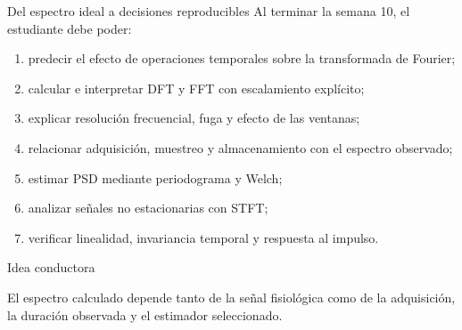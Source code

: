 \documentclass[
  10pt,
  ignorenonframetext,
  aspectratio=169,
  spanish,
]{beamer}
\providecommand{\tightlist}{%
  \setlength{\itemsep}{0pt}\setlength{\parskip}{0pt}}
\begin{document}
\begin{frame}{Del espectro ideal a decisiones reproducibles}
\label{d2-003}
Al terminar la semana 10, el estudiante debe poder:

\begin{enumerate}
\tightlist
\item
  predecir el efecto de operaciones temporales sobre la transformada de
  Fourier;
\item
  calcular e interpretar DFT y FFT con escalamiento explícito;
\item
  explicar resolución frecuencial, fuga y efecto de las ventanas;
\item
  relacionar adquisición, muestreo y almacenamiento con el espectro
  observado;
\item
  estimar PSD mediante periodograma y Welch;
\item
  analizar señales no estacionarias con STFT;
\item
  verificar linealidad, invariancia temporal y respuesta al impulso.
\end{enumerate}

\begin{block}{Idea conductora}

El espectro calculado depende tanto de la señal fisiológica como de la
adquisición, la duración observada y el estimador seleccionado.

\end{block}

\end{frame}
\end{document}
